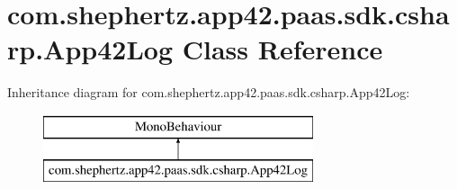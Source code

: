 \hypertarget{classcom_1_1shephertz_1_1app42_1_1paas_1_1sdk_1_1csharp_1_1_app42_log}{\section{com.\+shephertz.\+app42.\+paas.\+sdk.\+csharp.\+App42\+Log Class Reference}
\label{classcom_1_1shephertz_1_1app42_1_1paas_1_1sdk_1_1csharp_1_1_app42_log}
}
Inheritance diagram for com.\+shephertz.\+app42.\+paas.\+sdk.\+csharp.\+App42\+Log\+:\begin{figure}[H]
\begin{center}
\leavevmode
\includegraphics[height=2.000000cm]{classcom_1_1shephertz_1_1app42_1_1paas_1_1sdk_1_1csharp_1_1_app42_log}
\end{center}
\end{figure}
